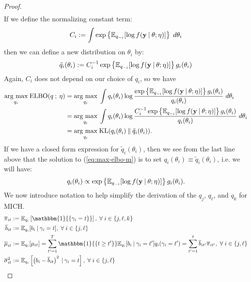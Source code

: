 \begin{proof}
\begin{align*}
\end{align*}
If we define the normalizing constant term:
\begin{align*}
    C_i := \int \exp\left\{\mathbb{E}_{q_{-i}}[\log f(\mathbf{y}\:|\: \theta;\eta)]\right\} \; d\theta_i
\end{align*}
then we can define a new distribution on $\theta_i$ by:
\begin{align*}
    \tilde{q}_i(\theta_i) := C^{-1}_i\exp\left\{\mathbb{E}_{q_{-i}}[\log f(\mathbf{y}\:|\: \theta;\eta)]\right\}g_{i}(\theta_i)
\end{align*}
Again, $C_i$ does not depend on our choice of $q_i$, so we have 
\begin{align*}
    \underset{q_i}{\text{arg max}} \; \text{ELBO}( q \:;\: \eta) &= \underset{q_i}{\text{arg max}} \; \int q_i(\theta_i) \log \frac{\exp\left\{\mathbb{E}_{q_{-i}}[\log f(\mathbf{y}\:|\: \theta;\eta)]\right\}g_i(\theta_i)}{q_i(\theta_i)} \; d\theta_i\\
    &= \underset{q_i}{\text{arg max}} \; \int q_i(\theta_i) \log \frac{C^{-1}_i\exp\left\{\mathbb{E}_{q_{-i}}[\log f(\mathbf{y}\:|\: \theta;\eta)]\right\}g_i(\theta_i)}{q_i(\theta_i)} \; d\theta_i \\
    &=  \underset{q_i}{\text{arg max}} \; \text{KL}(q_i(\theta_i) \:\lVert\: \tilde{q}_i(\theta_i)).
\end{align*}
If we have a closed form expression for $\tilde{q}_i(\theta_i)$, then we see from the last line above that the solution to (\ref{eq:max-elbo-m}) is to set $q_i(\theta_i) \equiv \tilde{q}_i(\theta_i)$, i.e. we will have:
\begin{align}
    q_i(\theta_i) \propto \exp\left\{\mathbb{E}_{q_{-i}}[\log f(\mathbf{y}\:|\: \theta;\eta)]\right\}g_i(\theta_i). \label{eq:q-soln}
\end{align}
We now introduce notation to help simplify the derivation of the $q_j$, $q_\ell$, and $q_k$ for MICH.
\begin{align*}
    \overline{\pi}_{i t} &:= \E_{q_i}\left[\mathbbm{1}{\left\{\gamma_i = t\right\}}\right], \sforall i \in \{j,\ell, k\} \\
    \overline{b}_{i t} &:= \E_{q_i}[b_i \:|\: \gamma_i = t], \sforall i \in \{j,\ell\}  \\
    \overline{\mu}_{it} &:= \E_{q_i}[\mu_{i t}] = \sum_{t'=1}^{T} \mathbbm{1}{\{t \geq t'\}}\E_{q_i}[b_i \:|\:\gamma_i = t']q_i(\gamma_i =t') = \sum_{t'=1}^t \overline{b}_{i t'} \overline{\pi}_{i t'}, \sforall i \in \{j,\ell\} \\
    \overline{\sigma}^2_{it} &:= \E_{q_i}\left[\left(b_i - \overline{b}_{i t}\right)^2\:|\: \gamma_i = t\right], \sforall i \in \{j,\ell\}  \\

\end{align*}
\end{proof}

